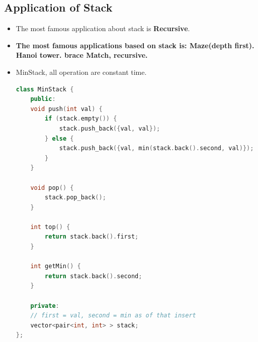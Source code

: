 \documentclass[a4paper,11pt,twoside]{book}
\begin{document}
\subsection{Application of Stack}
\begin{itemize}
		
\item The most famous application about stack is \textbf{Recursive}.
\item \textbf{The most famous applications based on stack is:  Maze(depth first). Hanoi tower. brace Match, recursive.}  

\item MinStack, all operation are constant time.
\begin{lstlisting}[frame=single, language=c++, basicstyle=\scriptsize]
class MinStack {
	public:
	void push(int val) {
		if (stack.empty()) {
			stack.push_back({val, val});
		} else {
			stack.push_back({val, min(stack.back().second, val)});
		}
	}
	
	void pop() {
		stack.pop_back();
	}
	
	int top() {
		return stack.back().first;
	}
	
	int getMin() {
		return stack.back().second;
	}
	
	private:
	// first = val, second = min as of that insert
	vector<pair<int, int> > stack;
};
\end{lstlisting}

\end{itemize}
\end{document}
